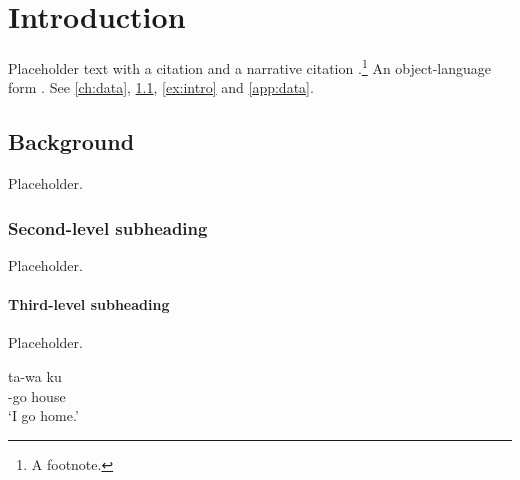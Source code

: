 \chapter{Introduction}\label{ch:intro}

Placeholder text with a citation \parencite[514--515]{murray-vennemann1983}
and a narrative citation \textcite[238]{mccarthy-prince1999}.\footnote{A footnote.}
An object-language form  . See \cref{ch:data},
\cref{sec:intro-background}, \cref{ex:intro} and \cref{app:data}.

\section{Background}\label{sec:intro-background}
Placeholder.

\subsection{Second-level subheading}
Placeholder.

\subsubsection{Third-level subheading}
Placeholder.

\ea\label{ex:intro}
  \gll ta-wa ku\\
       \Fsg-go house\\
  \glt `I go home.' 
\z

